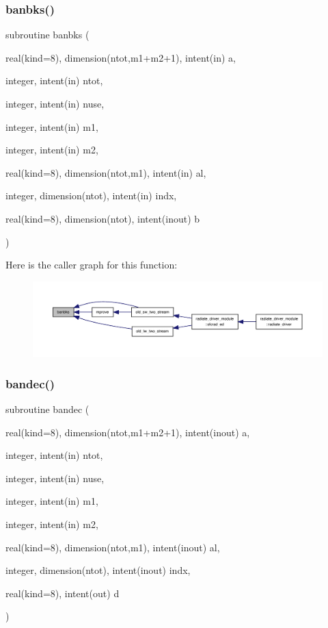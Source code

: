 \subsubsection{\texorpdfstring{banbks()}{banbks()}}
{\footnotesize\ttfamily subroutine banbks (\begin{DoxyParamCaption}\item[{real(kind=8), dimension(ntot,m1+m2+1), intent(in)}]{a,  }\item[{integer, intent(in)}]{ntot,  }\item[{integer, intent(in)}]{nuse,  }\item[{integer, intent(in)}]{m1,  }\item[{integer, intent(in)}]{m2,  }\item[{real(kind=8), dimension(ntot,m1), intent(in)}]{al,  }\item[{integer, dimension(ntot), intent(in)}]{indx,  }\item[{real(kind=8), dimension(ntot), intent(inout)}]{b }\end{DoxyParamCaption})}

Here is the caller graph for this function\+:
\nopagebreak
\begin{figure}[H]
\begin{center}
\leavevmode
\includegraphics[width=350pt]{old__twostream__rad_8f90_a43f0966137654368f596fcb9d9019b82_icgraph}
\end{center}
\end{figure}
\mbox{\label{old__twostream__rad_8f90_a6ebe8b542c9350d34aae0515753b29bf}} 
\subsubsection{\texorpdfstring{bandec()}{bandec()}}
{\footnotesize\ttfamily subroutine bandec (\begin{DoxyParamCaption}\item[{real(kind=8), dimension(ntot,m1+m2+1), intent(inout)}]{a,  }\item[{integer, intent(in)}]{ntot,  }\item[{integer, intent(in)}]{nuse,  }\item[{integer, intent(in)}]{m1,  }\item[{integer, intent(in)}]{m2,  }\item[{real(kind=8), dimension(ntot,m1), intent(inout)}]{al,  }\item[{integer, dimension(ntot), intent(inout)}]{indx,  }\item[{real(kind=8), intent(out)}]{d }\end{DoxyParamCaption})}

